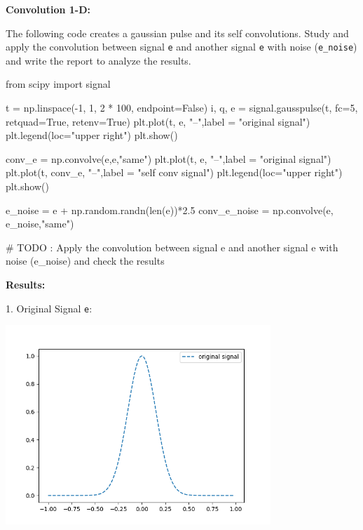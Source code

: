 \documentclass[a4paper, 10pt]{article}
\begin{document}
\begin{subproblems}[start=1]
    \item \textbf{Convolution 1-D:} \vspace{2mm}
    \par\noindent The following code creates a gaussian pulse and its self convolutions.
    Study and apply the convolution between signal \texttt{e} and another signal \texttt{e} with noise (\texttt{e\_noise}) and write the report to analyze the results.

    \begin{codingbox}
from scipy import signal

t = np.linspace(-1, 1, 2 * 100, endpoint=False)
i, q, e = signal.gausspulse(t, fc=5, retquad=True, retenv=True)
plt.plot(t, e, "--",label = "original signal")
plt.legend(loc="upper right")
plt.show()

conv_e = np.convolve(e,e,"same")
plt.plot(t, e, "--",label = "original signal")
plt.plot(t, conv_e, "--",label = "self conv signal")
plt.legend(loc="upper right")
plt.show()

e_noise = e + np.random.randn(len(e))*2.5
conv_e_noise = np.convolve(e, e_noise,"same")

# TODO : Apply the convolution between signal e and another signal e with noise (e_noise) and check the results
    \end{codingbox}

    \par\noindent \textbf{Results:} \par\noindent \vspace{3mm}

    1. Original Signal \texttt{e}:
    \begin{center}
        \includegraphics[width=0.75\textwidth]{images/problem_6_1_original_signal.png}
    \end{center}
    

\end{subproblems}
\end{document}
